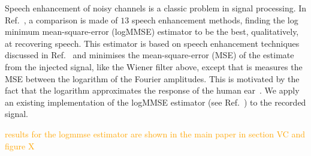 \documentclass[aps,pra,superscriptaddress,reprint,nofootinbib]{revtex4-1}
\newcommand{\han}{\textcolor{orange}}
\begin{document}
Speech enhancement of noisy channels is a classic problem in signal processing. 
In Ref.~\cite{SubjectiveComparison}, a comparison is made of $13$ speech enhancement methods, finding the log minimum mean-square-error (logMMSE) estimator to be the best, qualitatively, at recovering speech. 
This estimator is based on speech enhancement techniques discussed in Ref.~\cite{Ephraim1984SpeechEU_logMMSE} and minimises the mean-square-error (MSE) of the estimate from the injected signal, like the Wiener filter above, except that is measures the MSE between the logarithm of the Fourier amplitudes. This is motivated by the fact that the logarithm approximates the response of the human ear~\cite{SubjectiveComparison}. We apply an existing implementation of the logMMSE estimator (see Ref.~\cite{logmmse}) to the recorded signal.


\han{results for the logmmse estimator are shown in the main paper in section VC and figure X}




\end{document}
